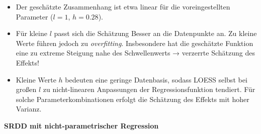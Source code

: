 \documentclass[
  letterpaper,
  DIV=11,
  oneside]{scrreprt}
\begin{document}
\begin{itemize}
\item
  Der geschätzte Zusammenhang ist etwa linear für die voreingestellten
  Parameter (\(l = 1\), \(h = 0.28\)).
\item
  Für kleine \(l\) passt sich die Schätzung Besser an die Datenpunkte
  an. Zu kleine Werte führen jedoch zu \emph{overfitting}. Insbesondere
  hat die geschätzte Funktion eine zu extreme Steigung nahe des
  Schwellenwerts → verzerrte Schätzung des Effekts!
\item
  Kleine Werte \(h\) bedeuten eine geringe Datenbasis, sodass LOESS
  selbst bei großen \(l\) zu nicht-linearen Anpassungen der
  Regressionsfunktion tendiert. Für solche Parameterkombinationen
  erfolgt die Schätzung des Effekts mit hoher Varianz.
\end{itemize}

\textbf{SRDD mit nicht-parametrischer Regression}
\end{document}
